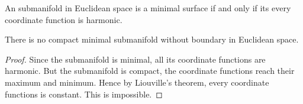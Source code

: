 \begin{cor}
    An submanifold in Euclidean space is a minimal surface if and only if its every coordinate function is harmonic.
\end{cor}

\begin{cor}
    There is no compact minimal submanifold without boundary in Euclidean space.
\end{cor}
\begin{proof}
    Since the submanifold is minimal, all its coordinate functions are harmonic.
    But the submanifold is compact, the coordinate functions reach their maximum and minimum.
    Hence by Liouville's theorem, every coordinate functions is constant.
    This is impossible.
\end{proof}